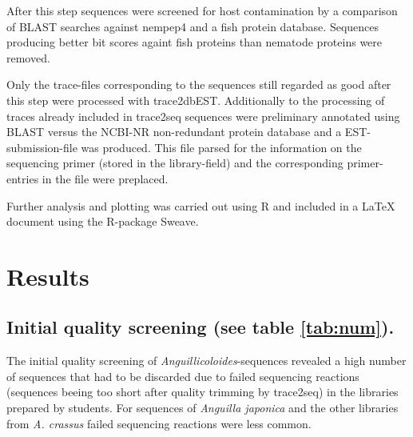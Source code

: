 \documentclass[12pt,a4paper]{article}
\begin{document}
After this step sequences were screened for host contamination by a
comparison of BLAST searches against nempep4 and a fish protein
database. Sequences producing better bit scores againt fish proteins
than nematode proteins were removed.

Only the trace-files corresponding to the sequences still regarded as
good after this step were processed with trace2dbEST. Additionally to
the processing of traces already included in trace2seq sequences were
preliminary annotated using BLAST versus the NCBI-NR non-redundant
protein database and a EST-submission-file was produced. This file
parsed for the information on the sequencing primer (stored in the
library-field) and the corresponding primer-entries in the file were
preplaced.

Further analysis and plotting was carried out using R\cite{R_project}
and included in a {\LaTeX} document using the R-package
Sweave\cite{lmucs-papers:Leisch:2002}.

\section*{Results}

\subsection*{Initial quality screening (see table \ref{tab:num}).}

The initial quality screening of \textit{Anguillicoloides}-sequences
revealed a high number of sequences that had to be discarded due to
failed sequencing reactions (sequences beeing too short after quality
trimming by trace2seq) in the libraries prepared by students. For
sequences of \textit{Anguilla japonica} and the other libraries from
\textit{A. crassus} failed sequencing reactions were less common.
\end{document}
